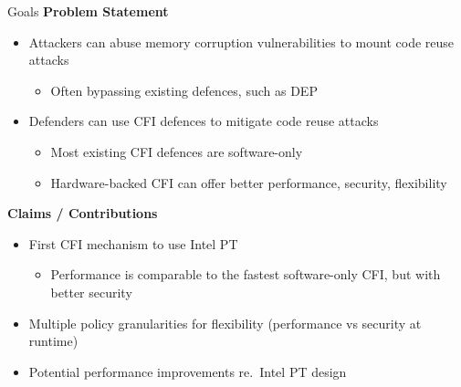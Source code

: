 \documentclass[12pt, dvipsnames, aspectratio=169]{beamer}
\begin{document}
\begin{frame}[c]{Goals}{}
  {\bf Problem Statement}
  \begin{itemize}
    \item Attackers can abuse memory corruption vulnerabilities to mount code reuse attacks
    \begin{itemize}
      \item Often bypassing existing defences, such as DEP
    \end{itemize}
    \item Defenders can use CFI defences to mitigate code reuse attacks
    \begin{itemize}
      \item Most existing CFI defences are software-only
      \item Hardware-backed CFI can offer better performance, security, flexibility
    \end{itemize}
  \end{itemize}

  \vfill
  {\bf Claims / Contributions}
  \begin{itemize}
    \item First CFI mechanism to use Intel PT
    \begin{itemize}
      \item Performance is comparable to the fastest software-only CFI, but with better security
    \end{itemize}
    \item Multiple policy granularities for flexibility (performance vs security at runtime)
    \item Potential performance improvements re.~Intel PT design
  \end{itemize}
\end{frame}
\end{document}
